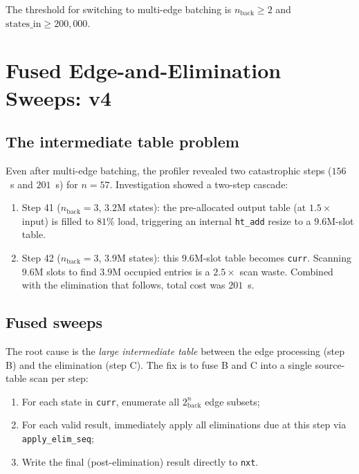 \documentclass[12pt]{article}
\theoremstyle{definition}
\newcommand{\nb}{n_{\mathrm{back}}}
\begin{document}
The threshold for switching to multi-edge batching is $\nb \ge 2$ and
$\text{states\_in} \ge 200{,}000$.

\section{Fused Edge-and-Elimination Sweeps: v4}
\label{sec:v4}

\subsection{The intermediate table problem}

Even after multi-edge batching, the profiler revealed two catastrophic steps
($156$~s and $201$~s) for $n = 57$.
Investigation showed a two-step cascade:
\begin{enumerate}[nosep]
  \item Step 41 ($\nb = 3$, $3.2$M states): the pre-allocated output table
        (at $1.5\times$ input) is filled to $81\%$ load, triggering an
        internal \texttt{ht\_add} resize to a $9.6$M-slot table.
  \item Step 42 ($\nb = 3$, $3.9$M states): this $9.6$M-slot table becomes
        \texttt{curr}.  Scanning $9.6$M slots to find $3.9$M occupied entries
        is a $2.5\times$ scan waste.  Combined with the elimination that
        follows, total cost was $201$~s.
\end{enumerate}

\subsection{Fused sweeps}

The root cause is the \emph{large intermediate table} between the edge
processing (step B) and the elimination (step C).
The fix is to fuse B and C into a single source-table scan per step:

\begin{enumerate}[nosep]
  \item For each state in \texttt{curr}, enumerate all $2^\nb$ edge subsets;
  \item For each valid result, immediately apply all eliminations due at this
        step via \texttt{apply\_\allowbreak elim\_\allowbreak seq};
  \item Write the final (post-elimination) result directly to \texttt{nxt}.
\end{enumerate}
\end{document}
